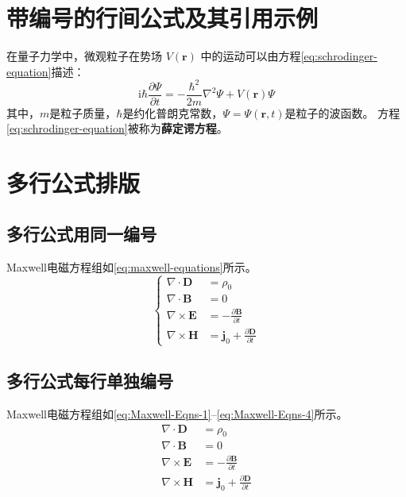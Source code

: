 \documentclass{article}
\begin{document}
\section{带编号的行间公式及其引用示例}

在量子力学中，微观粒子在势场 \(V(\mathbf{r})\) 中的运动可以由方程\eqref{eq:schrodinger-equation}描述：
\begin{equation}
    \label{eq:schrodinger-equation}
    \mathrm{i} \hbar \frac{\partial \Psi}{\partial t} = 
    - \frac{\hbar^2}{2m} \nabla^2 \Psi + V(\mathbf{r}) \Psi
\end{equation}
其中，$m$是粒子质量，$\hbar$是约化普朗克常数，$\Psi=\Psi(\mathbf{r},t)$是粒子的波函数。
方程\eqref{eq:schrodinger-equation}被称为\textbf{薛定谔方程}。


\section{多行公式排版}

\subsection{多行公式用同一编号}

Maxwell电磁方程组如\eqref{eq:maxwell-equations}所示。
\begin{equation}
    \label{eq:maxwell-equations}
    \left\{
      \begin{aligned}
        \nabla \cdot \mathbf{D} &= \rho_0 \\
        \nabla \cdot \mathbf{B} &= 0 \\
        \nabla \times \mathbf{E} &= -\frac{\partial \mathbf{B}}{\partial t} \\
        \nabla \times \mathbf{H} &= \mathbf{j}_0 + \frac{\partial \mathbf{D}}{\partial t}
      \end{aligned}
    \right.
\end{equation}


\subsection{多行公式每行单独编号}
Maxwell电磁方程组如\eqref{eq:Maxwell-Eqns-1}--\eqref{eq:Maxwell-Eqns-4}所示。
\begin{align}
    \label{eq:Maxwell-Eqns-1}
    \nabla \cdot \mathbf{D} &= \rho_0 \\
    \label{eq:Maxwell-Eqns-2}
    \nabla \cdot \mathbf{B} &= 0 \\
    \label{eq:Maxwell-Eqns-3}
    \nabla \times \mathbf{E} &= -\frac{\partial \mathbf{B}}{\partial t} \\
    \label{eq:Maxwell-Eqns-4}
    \nabla \times \mathbf{H} &= \mathbf{j}_0 + \frac{\partial \mathbf{D}}{\partial t}
\end{align}
\end{document}
